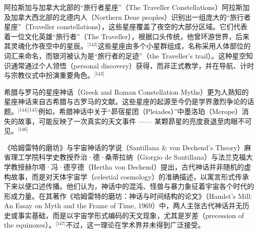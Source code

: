 阿拉斯加与加拿大北部的“旅行者星座”（The Traveller Constellations）阿拉斯加及加拿大西北部的北德内人（Northern Dene peoples）识别出一组庞大的“旅行者星座”（Traveller constellations），这些星座覆盖了夜空的大部分区域。它们代表着一位文化英雄“旅行者”（The Traveller），根据口头传统，他曾环游世界，后来其灵魂化作夜空中的星辰。\(^\text{[142]}\)这些星座由多个小星群组成，名称采用人体部位的词汇来命名，而银河被认为是“旅行者的足迹”（the Traveller’s trail）。这种星空知识通常通过个人领悟（personal discovery）获得，而非正式教学，并在导航、计时与宗教仪式中扮演重要角色。\(^\text{[143]}\)

希腊与罗马的星座神话（Greek and Roman Constellation Myths）更为人熟知的星座神话来自古希腊与古罗马的文献。这些星座的起源至今仍是学界激烈争论的话题。\(^\text{[144][145]}\)例如，希腊神话中关于“昴宿星团（Pleiades）”中墨洛珀（Merope）消失的故事，可能反映了一次真实的天文事件 —— 某颗昴星的亮度衰退至肉眼不可见。\(^\text{[146]}\)

《哈姆雷特的磨坊》与宇宙神话的学说（Santillana & von Dechend’s Theory）麻省理工学院科学史教授乔治·德·桑蒂拉纳（Giorgio de Santillana）与法兰克福大学教授赫尔塔·冯·德亨德（Hertha von Dechend）提出，古代神话并非随机的虚构故事，而是对天体宇宙学（celestial cosmology）的准确描述，以寓言形式传承下来以便口述传播。他们认为，神话中的混沌、怪兽与暴力象征着宇宙各个时代的形成力量。在其著作《哈姆雷特的磨坊：神话与时间结构的论文》（Hamlet’s Mill: An Essay on Myth and the Frame of Time, 1969）中，两人主张古代神话并无历史或事实基础，而是以宇宙学形式编码的天文现象，尤其是岁差（precession of the equinoxes）。\(^\text{[147]}\)不过，这一理论在学术界并未得到广泛接受。
